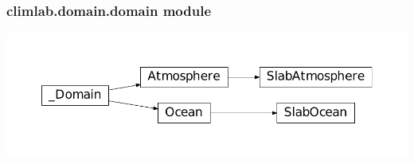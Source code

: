 \documentclass[a4paper,10pt,english]{sphinxmanual}
\begin{document}
\subsubsection{climlab.domain.domain module}
\label{api/climlab.domain:climlab-domain-domain-module}
\includegraphics{inheritance-370eb7bb9929bc3993457a6ca9fc0b68128e90d7.pdf}
\label{api/climlab.domain:module-climlab.domain.domain}
\end{document}
